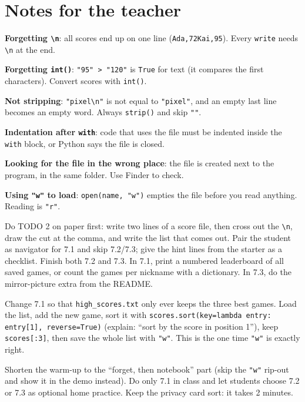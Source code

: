 \section{Notes for the teacher}
\begin{commonmistakes}
  \item \textbf{Forgetting \texttt{\textbackslash n}}: all scores end up on one line (\texttt{Ada,72Kai,95}). Every \texttt{write} needs \texttt{\textbackslash n} at the end.
  \item \textbf{Forgetting \texttt{int()}}: \texttt{"95" > "120"} is \texttt{True} for text (it compares the first characters). Convert scores with \texttt{int()}.
  \item \textbf{Not stripping}: \texttt{"pixel\textbackslash n"} is not equal to \texttt{"pixel"}, and an empty last line becomes an empty word. Always \texttt{strip()} and skip \texttt{""}.
  \item \textbf{Indentation after \texttt{with}}: code that uses the file must be indented inside the \texttt{with} block, or Python says the file is closed.
  \item \textbf{Looking for the file in the wrong place}: the file is created next to the program, in the same folder. Use Finder to check.
  \item \textbf{Using \texttt{"w"} to load}: \texttt{open(name, "w")} empties the file before you read anything. Reading is \texttt{"r"}.
\end{commonmistakes}

\begin{differentiation}
\supportpath Do TODO 2 on paper first: write two lines of a score file, then cross out the \texttt{\textbackslash n}, draw the cut at the comma,
and write the list that comes out. Pair the student as navigator for 7.1 and skip 7.2/7.3; give the hint lines from the starter as a checklist.
\extensionpath Finish both 7.2 and 7.3. In 7.1, print a numbered leaderboard of all saved games, or count the games per nickname with a dictionary.
In 7.3, do the mirror-picture extra from the README.
\end{differentiation}

\begin{stretchchallenge}
Change 7.1 so that \texttt{high\_scores.txt} only ever keeps the three best games. Load the list, add the new game, sort it with
\texttt{scores.sort(key=lambda entry: entry[1], reverse=True)} (explain: \enquote{sort by the score in position 1}), keep \texttt{scores[:3]}, then save the
whole list with \texttt{"w"}. This is the one time \texttt{"w"} is exactly right.
\end{stretchchallenge}

\begin{teachernote}
Shorten the warm-up to the \enquote{forget, then notebook} part (skip the \texttt{"w"} rip-out and show it in the demo instead).
Do only 7.1 in class and let students choose 7.2 or 7.3 as optional home practice. Keep the privacy card sort: it takes 2 minutes.
\end{teachernote}
